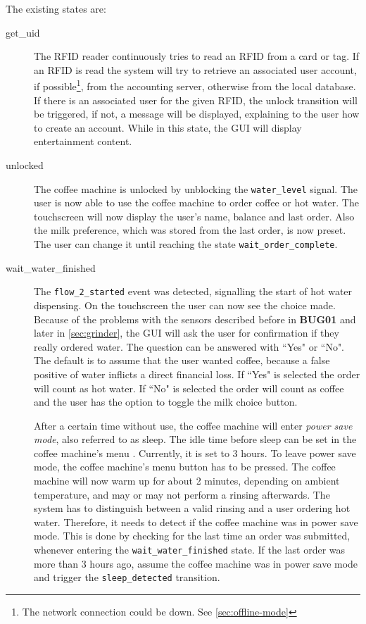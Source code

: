\documentclass[12pt]{article}
\begin{document}
The existing states are:
\begin{description}
  \item [get\_uid] The RFID reader continuously tries to read an RFID from a card or tag.
        If an RFID is read the system will try to retrieve an associated user account, if possible\footnote{The network connection could be down. See \autoref{sec:offline-mode}}, from the accounting server, otherwise from the local database.
        If there is an associated user for the given RFID, the unlock transition will be triggered, if not, a message will be displayed,
        explaining to the user how to create an account.
        While in this state, the GUI will display entertainment content.

  \item [unlocked] The coffee machine is unlocked by unblocking the \texttt{water\_level} signal.
        The user is now able to use the coffee machine to order coffee or hot water.
        The touchscreen will now display the user's name, balance and last order.
        Also the milk preference, which was stored from the last order, is now preset.
        The user can change it until reaching the state \texttt{wait\_order\_complete}.

  \item [wait\_water\_finished]
        \label{itm:bug01}
        The \texttt{flow\_2\_started} event was detected, signalling the start of hot water dispensing.
        On the touchscreen the user can now see the choice made. Because of the problems with the sensors described before in \textbf{BUG01} and later in \autoref{sec:grinder},
        the GUI will ask the user for confirmation if they really ordered water. The question can be answered with ``Yes" or ``No".
        The default is to assume that the user wanted coffee, because a false positive of water inflicts a direct financial loss.
        If ``Yes" is selected the order will count as hot water. If ``No" is selected the order will count as coffee and
        the user has the option to toggle the milk choice button.

        After a certain time without use, the coffee machine will enter \textit{power save mode}, also referred to as sleep.
        The idle time before sleep can be set in the coffee machine's menu \cite{Saeco}.
        Currently, it is set to 3 hours.
        To leave power save mode, the coffee machine's menu button has to be pressed.
        The coffee machine will now warm up for about 2 minutes, depending on ambient temperature, and may or may not perform a rinsing afterwards.
        The system has to distinguish between a valid rinsing and a user ordering hot water.
        Therefore, it needs to detect if the coffee machine was in power save mode.
        This is done by checking for the last time an order was submitted, whenever entering the \texttt{wait\_water\_finished} state.
        If the last order was more than 3 hours ago,
        assume the coffee machine was in power save mode and trigger the \texttt{sleep\_detected} transition.


\end{description}
\end{document}
